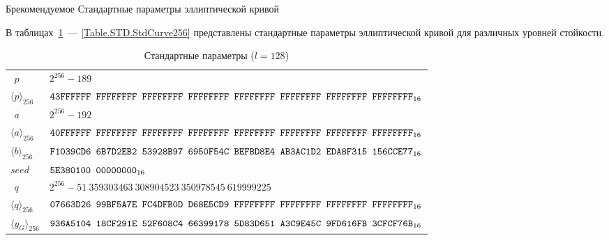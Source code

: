 \begin{appendix}{Б}{рекомендуемое}
{Стандартные параметры эллиптической кривой}
\label{STD}

\mbox{}

В таблицах~\ref{Table.STD.StdCurve128}~--- \ref{Table.STD.StdCurve256} 
представлены стандартные параметры 
эллиптической кривой для различных уровней стойкости.

\begin{table}[!h]
\caption{Стандартные параметры ($l=128$)}\label{Table.STD.StdCurve128}
{\small
\begin{tabular}{|l|l|}
\hline
$\phantom{\langle}p\phantom{\rangle}$ &
$2^{256}-189$\\
$\langle p\rangle_{256}$ & 
$\texttt{43FFFFFF~FFFFFFFF~FFFFFFFF~FFFFFFFF~FFFFFFFF~FFFFFFFF~FFFFFFFF~FFFFFFFF}_{16}$\\
%
\hline
$\phantom{\langle}a\phantom{\rangle}$ &
$2^{256}-192$\\
$\langle a\rangle_{256}$ & 
$\texttt{40FFFFFF~FFFFFFFF~FFFFFFFF~FFFFFFFF~FFFFFFFF~FFFFFFFF~FFFFFFFF~FFFFFFFF}_{16}$\\
%
\hline
$\langle b\rangle_{256}$ & 
$\texttt{F1039CD6~6B7D2EB2~53928B97~6950F54C~BEFBD8E4~AB3AC1D2~EDA8F315~156CCE77}_{16}$\\
%
\hline
$seed$ & 
$\texttt{5E380100~00000000}_{16}$\\
%
\hline
$\phantom{\langle}q\phantom{\rangle}$ &
$2^{256}-51~359303463~308904523~350978545~619999225$\\
$\langle q\rangle_{256}$ & 
$\texttt{07663D26~99BF5A7E~FC4DFB0D~D68E5CD9~FFFFFFFF~FFFFFFFF~FFFFFFFF~FFFFFFFF}_{16}$\\
%
\hline
$\langle y_G\rangle_{256}$ & 
$\texttt{936A5104~18CF291E~52F608C4~66399178~5D83D651~A3C9E45C~9FD616FB~3CFCF76B}_{16}$\\
\hline
\end{tabular}
}
\end{table}

%
%
%


\end{appendix}
